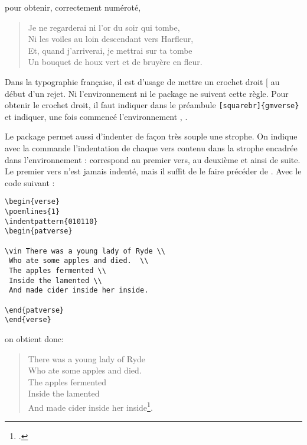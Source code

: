 pour obtenir, correctement numéroté, 

\begin{verse}


Je ne regarderai ni l'or du soir qui tombe,\\
Ni les voiles au loin descendant vers Harfleur,\\
Et, quand j'arriverai, je mettrai sur ta tombe\\
Un bouquet de houx vert et de bruyère en fleur.

\end{verse}

\begin{anedocte}
Dans la typographie française, il est d'usage de mettre un crochet droit [ au début d'un rejet. Ni l'environnement ni le package  ne suivent cette règle. Pour obtenir le crochet droit, il faut indiquer dans le préambule \verb|[squarebr]{gmverse}| et indiquer, une fois commencé l'environnement , .
\end{anedocte}

Le package  permet aussi d'indenter de façon très souple une strophe. On indique avec la commande  l'indentation de chaque vers contenu dans la strophe encadrée dans l'environnement :  correspond au premier vers,  au deuxième et ainsi de suite. Le premier vers n'est jamais indenté, mais il suffit de le faire précéder de . Avec le code suivant :

\begin{verbatim}
\begin{verse} 
\poemlines{1}
\indentpattern{010110} 
\begin{patverse} 

\vin There was a young lady of Ryde \\
 Who ate some apples and died.  \\
 The apples fermented \\
 Inside the lamented \\
 And made cider inside her inside. 

\end{patverse}  
\end{verse}
\end{verbatim}

on obtient donc:
  
\begin{verse} 

 \begin{patverse} 

\vin There was a young lady of Ryde \\
 Who ate some apples and died.  \\
 The apples fermented \\
 Inside the lamented \\
 And made cider inside her inside\footcite{EdwardLear}. 

\end{patverse}  \end{verse} 
 
